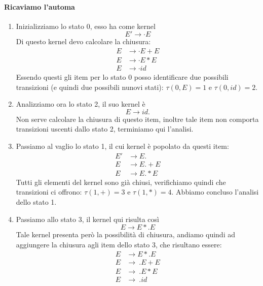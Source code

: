 \documentclass[class=book, crop=false, oneside, 12pt]{standalone}
\begin{document}
\paragraph{Ricaviamo l'automa}
\begin{enumerate}
    \item Inizializziamo lo stato 0, esso ha come kernel 
    \begin{equation*}
        E' \to \cdot E
    \end{equation*}
    Di questo kernel devo calcolare la chiusura:
    \begin{align*}
        E &\to \cdot E+E \\
        E &\to \cdot E*E \\
        E &\to \cdot id
    \end{align*}
    Essendo questi gli item per lo stato 0 posso identificare due possibili transizioni (e quindi due possibili nunovi stati): \(\tau(0,E)=1 \textrm{ e } \tau(0,id)=2\).
    \item Analizziamo ora lo stato 2, il suo kernel è 
    \begin{equation*}
        E \to id.    
    \end{equation*}
    Non serve calcolare la chiusura di questo item, inoltre tale item non comporta transizioni uscenti dallo stato 2, terminiamo qui l'analisi.
    \item Passiamo al vaglio lo stato 1, il cui kernel è popolato da questi item:
    \begin{align*}
        E'&\to E.\\
        E  &\to E.+E \\
        E  &\to E.*E
    \end{align*}
    Tutti gli elementi del kernel sono già chiusi, verifichiamo quindi che transizioni ci offrono: \(\tau(1,+)=3 \textrm{ e } \tau(1,*)=4\).
    Abbiamo concluso l'analisi dello stato 1.
    \item Passiamo allo stato 3, il kernel qui risulta così
    \begin{equation*}
        E \to E*.E
    \end{equation*}
    Tale kernel presenta però la possibilità di chiusura, andiamo quindi ad aggiungere la chiusura agli item dello stato 3, che risultano essere:
    \begin{align*}
        E &\to E*.E \\
        E &\to\ .E+E \\
        E &\to\ .E*E \\
        E &\to\ .id
    \end{align*}

\end{enumerate}
\end{document}
